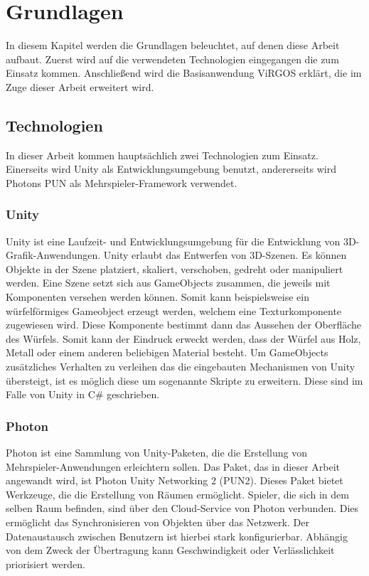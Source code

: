 \section{Grundlagen}
In diesem Kapitel werden die Grundlagen beleuchtet, auf denen diese Arbeit aufbaut. Zuerst wird auf die verwendeten Technologien eingegangen die zum Einsatz kommen. Anschließend wird die Basisanwendung ViRGOS erklärt, die im Zuge dieser Arbeit erweitert wird. 

\subsection{Technologien}

In dieser Arbeit kommen hauptsächlich zwei Technologien zum Einsatz. Einerseits wird Unity als Entwicklungsumgebung benutzt, andererseits wird Photons PUN als Mehrspieler-Framework verwendet. 

\subsubsection*{Unity}
Unity ist eine Laufzeit- und Entwicklungsumgebung für die Entwicklung von 3D-Grafik-Anwendungen. Unity erlaubt das Entwerfen von 3D-Szenen. Es können Objekte in der Szene platziert, skaliert, verschoben, gedreht oder manipuliert werden. Eine Szene setzt sich aus GameObjects zusammen, die jeweils mit Komponenten versehen werden können. Somit kann beispielsweise ein würfelförmiges Gameobject erzeugt werden, welchem eine Texturkomponente zugewiesen wird. Diese Komponente bestimmt dann das Aussehen der Oberfläche des Würfels. Somit kann der Eindruck erweckt werden, dass der Würfel aus Holz, Metall oder einem anderen beliebigen Material besteht. Um GameObjects zusätzliches Verhalten zu verleihen das die eingebauten Mechanismen von Unity übersteigt, ist es möglich diese um sogenannte Skripte zu erweitern. Diese sind im Falle von Unity in C\# geschrieben.

\subsubsection*{Photon}
Photon ist eine Sammlung von Unity-Paketen, die die Erstellung von Mehrspieler-Anwendungen erleichtern sollen. Das Paket, das in dieser Arbeit angewandt wird, ist \glqq Photon Unity Networking 2\grqq{} (PUN2). Dieses Paket bietet Werkzeuge, die die Erstellung von Räumen ermöglicht. Spieler, die sich in dem selben Raum befinden, sind über den Cloud-Service von Photon verbunden. Dies ermöglicht das Synchronisieren von Objekten über das Netzwerk. Der Datenaustausch zwischen Benutzern ist hierbei stark konfigurierbar. Abhängig von dem Zweck der Übertragung kann Geschwindigkeit oder Verlässlichkeit priorisiert werden.

